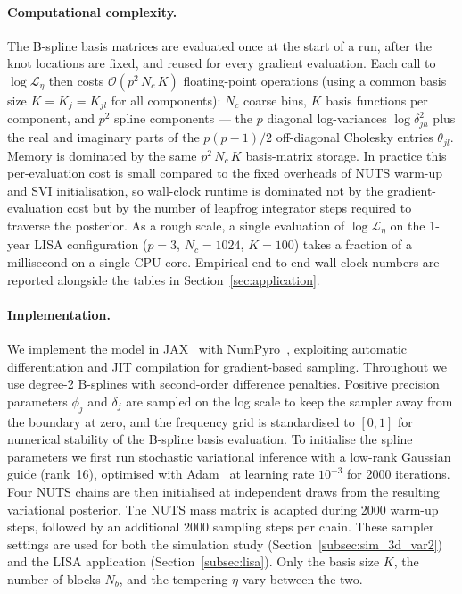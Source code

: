 \documentclass[%
	reprint,
	nofootinbib,
	amsmath,
	amssymb,
	aps,
]{revtex4-2}
\begin{document}
	\paragraph{Computational complexity.}
	The B-spline basis matrices are evaluated once at the start of a run,
	after the knot locations are fixed, and reused for every gradient
	evaluation. Each call to $\log\mathcal{L}_{\eta}$ then costs
	$\mathcal{O}(p^{2}\,N_{c}\,K)$ floating-point operations (using a common
	basis size $K = K_j = K_{jl}$ for all components):
	$N_{c}$ coarse bins, $K$ basis functions per component, and $p^{2}$ spline
	components --- the $p$ diagonal log-variances $\log\delta_{jh}^{2}$
	plus the real and imaginary parts of the $p(p-1)/2$ off-diagonal
	Cholesky entries $\theta_{jl}$. Memory is dominated by the same
	$p^{2}\,N_{c}\,K$ basis-matrix storage. In practice this
	per-evaluation cost is small compared to the fixed overheads of NUTS
	warm-up and SVI initialisation, so wall-clock runtime is dominated
	not by the gradient-evaluation cost but by the number of leapfrog
	integrator steps required to traverse the posterior. As a rough
	scale, a single evaluation of $\log\mathcal{L}_{\eta}$ on the 1-year
	LISA configuration ($p=3$, $N_{c}=1024$, $K=100$) takes a fraction
	of a millisecond on a single CPU core. Empirical end-to-end
	wall-clock numbers are reported alongside the tables in
	Section~\ref{sec:application}.


	\paragraph{Implementation.}
	\label{sec:computation}
	We implement the model in \textsc{JAX}~\cite{jax2018github} with
	NumPyro~\cite{phan2019numphyro}, exploiting automatic differentiation
	and JIT compilation for gradient-based sampling. Throughout we use
	degree-2 B-splines with second-order difference penalties. Positive
	precision parameters $\phi_{j}$ and $\delta_{j}$ are sampled on the
	log scale to keep the sampler away from the boundary at zero, and
	the frequency grid is standardised to $[0,1]$ for numerical
	stability of the B-spline basis evaluation. To initialise the spline
	parameters we first run stochastic variational inference
	\citep[SVI;][]{hoffman2013_SVI} with a low-rank Gaussian guide
	(rank~16), optimised with Adam~\citep{Kingma2015} at learning rate
	$10^{-3}$ for 2000 iterations. Four NUTS chains are then initialised
	at independent draws from the resulting variational posterior. The
	NUTS mass matrix is adapted during 2000 warm-up steps, followed by
	an additional 2000 sampling steps per chain. These sampler settings
	are used for both the simulation study
	(Section~\ref{subsec:sim_3d_var2}) and the LISA application
	(Section~\ref{subsec:lisa}). Only the basis size $K$, the number of
	blocks $N_{b}$, and the tempering $\eta$ vary between the two.
\end{document}
